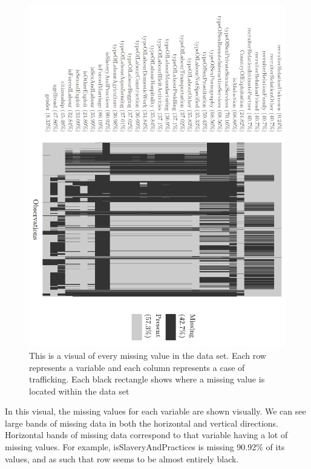\documentclass{article} %
\begin{document}
	\FloatBarrier
	\begin{figure}[H]
		\hspace*{-2cm}
		\includegraphics[height = 1.4\textwidth, angle = 90]{NaniarVis1}
		\caption[]{This is a visual of every missing value in the data set. Each row represents a variable and each column represents a case of trafficking. Each black rectangle shows where a missing value is located within the data set}
		\label{fig:Naniar}
	\end{figure}
	\FloatBarrier
In this visual, the missing values for each variable are shown visually. We can see large bands of missing data in both the horizontal and vertical directions. Horizontal bands of missing data correspond to that variable having a lot of missing values. For example, isSlaveryAndPractices is missing 90.92\% of its values, and as such that row seems to be almost entirely black. 
\end{document}
